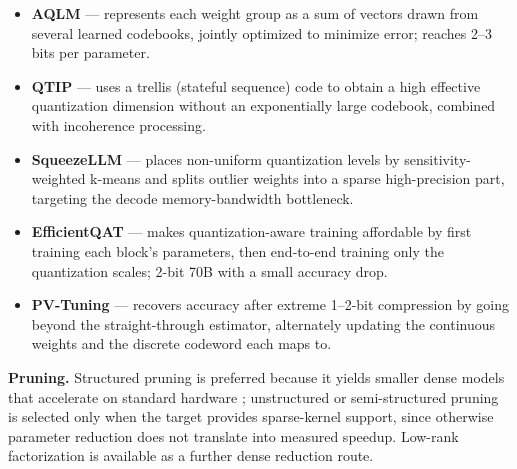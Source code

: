 \documentclass[
11pt, %
english, %
singlespacing, %
headsepline, %
]{MastersDoctoralThesis} %
\begin{document}
\begin{itemize}
  \item \textbf{AQLM} \cite{egiazarian2024aqlm} --- represents each weight group as a sum of vectors drawn from several learned codebooks, jointly optimized to minimize error; reaches 2--3 bits per parameter.

  \item \textbf{QTIP} \cite{tseng2024qtip} --- uses a trellis (stateful sequence) code to obtain a high effective quantization dimension without an exponentially large codebook, combined with incoherence processing.

  \item \textbf{SqueezeLLM} \cite{kim2024squeezellm} --- places non-uniform quantization levels by sensitivity-weighted k-means and splits outlier weights into a sparse high-precision part, targeting the decode memory-bandwidth bottleneck.

  \item \textbf{EfficientQAT} \cite{chen2025efficientqat} --- makes quantization-aware training affordable by first training each block's parameters, then end-to-end training only the quantization scales; 2-bit 70B with a small accuracy drop.

  \item \textbf{PV-Tuning} \cite{malinovskii2024pvtuning} --- recovers accuracy after extreme 1--2-bit compression by going beyond the straight-through estimator, alternately updating the continuous weights and the discrete codeword each maps to.

\end{itemize}

\textbf{Pruning.} Structured pruning is preferred because it yields smaller dense models that accelerate on standard hardware \cite{ma2023llmpruner,ashkboos2024slicegpt,men2024shortgpt}; unstructured or semi-structured pruning \cite{frantar2023sparsegpt,sun2024wanda} is selected only when the target provides sparse-kernel support, since otherwise parameter reduction does not translate into measured speedup. Low-rank factorization \cite{wang2025svdllm} is available as a further dense reduction route.
\end{document}
